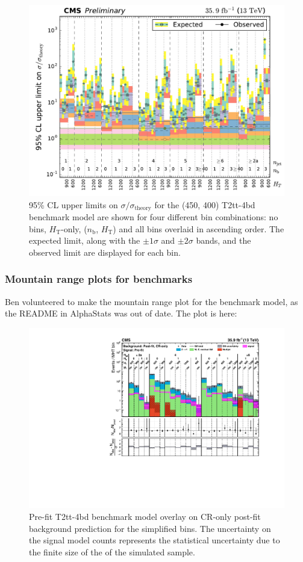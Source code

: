 \begin{figure}[H]
\centering
\includegraphics[width=120mm]{./sec31/SMS-T2tt_mStop-450_mLSP-400_25ns_limits_nj_nb_ht.pdf}
\caption{95\% CL upper limits on $\sigma / \sigma_{\mathrm{theory}}$ for the (450, 400) T2tt-4bd benchmark model are shown for four different bin combinations: no bins, $H_{\mathrm{T}}$-only, ($n_{\mathrm{b}}$, $H_{\mathrm{T}}$) and all bins overlaid in ascending order. The expected limit, along with the $\pm 1 \sigma$ and $\pm 2 \sigma$ bands, and the observed limit are displayed for each bin.}
\end{figure}


\subsubsection{Mountain range plots for benchmarks}

Ben volunteered to make the mountain range plot for the benchmark model, as the README in AlphaStats was out of date. The plot is here:

\begin{figure}[H]
\centering
\includegraphics[width=140mm]{./sec31/all_full-fit-sig-top_bins_25.pdf}
\caption{Pre-fit T2tt-4bd benchmark model overlay on CR-only post-fit background prediction for the simplified bins. The uncertainty on the signal model counts represents the statistical uncertainty due to the finite size of the of the simulated sample.}
\end{figure}


